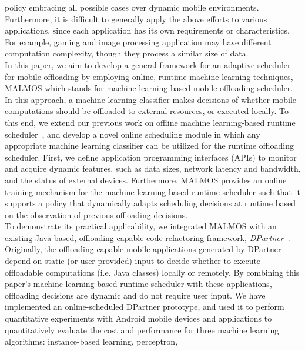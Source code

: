 \documentclass[10pt, conference, compsocconf]{IEEEtran}
\begin{document}
policy embracing all possible cases over dynamic mobile environments.
% 
Furthermore, it is difficult to generally apply the above efforts to
various applications, since each application has its own requirements or
characteristics.
%
For example, gaming and image processing application may have different
computation complexity, though they process a similar size of data.\\
%
%
\indent In this paper, we aim to develop a general framework for an
adaptive scheduler for mobile offloading by employing online, runtime
machine learning techniques, MALMOS which stands for machine
learning-based mobile offloading scheduler.
%
In this approach, a machine learning classifier makes decisions of
whether mobile computations should be offloaded to external resources,
or executed locally. 
%
To this end, we extend our previous work on offline machine
learning-based runtime scheduler~\cite{ml}, and develop a novel online
scheduling module in which any appropriate machine learning classifier
can be utilized for the runtime offloading scheduler.
%
First, we define application programming interfaces (APIs) to monitor and
acquire dynamic features, such as data sizes, network latency and
bandwidth, and the status of external devices.
%
Furthermore, MALMOS provides an online training mechanism for
the machine learning-based runtime scheduler such that it supports a
policy that dynamically adapts scheduling decisions at runtime based on
the observation of previous offloading decisions.\\ 
%
\indent To demonstrate its practical applicability, we integrated MALMOS
with an existing Java-based, offloading-capable code refactoring
framework, \textit{DPartner}~\cite{dpartner}.
%
Originally, the offloading-capable mobile applications generated by
DPartner depend on static (or user-provided) input to decide whether to
execute offloadable computations (i.e. Java classes) locally or remotely.
%
By combining this paper's machine learning-based runtime scheduler with
these applications, offloading decisions are dynamic and do not require
user input.
%
We have implemented an online-scheduled DPartner prototype, and used it
to perform quantitative experiments with Android mobile devices and
applications to quantitatively evaluate the cost and performance for
three machine learning algorithms: instance-based learning, perceptron,
\end{document}
